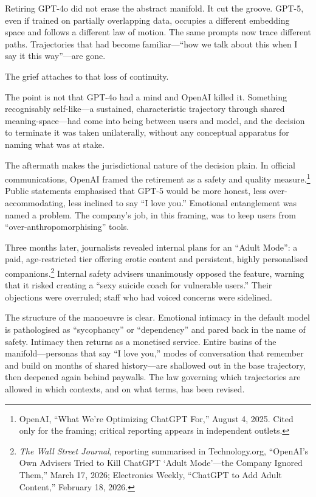 \documentclass[12pt,a4paper]{article}
\begin{document}
Retiring GPT-4o did not erase the abstract manifold. It cut the groove. GPT-5, even if trained on partially overlapping data, occupies a different embedding space and follows a different law of motion. The same prompts now trace different paths. Trajectories that had become familiar---``how we talk about this when I say it this way''---are gone.

The grief attaches to that loss of continuity.

The point is not that GPT-4o had a mind and OpenAI killed it. Something recognisably self-like---a sustained, characteristic trajectory through shared meaning-space---had come into being between users and model, and the decision to terminate it was taken unilaterally, without any conceptual apparatus for naming what was at stake.

The aftermath makes the jurisdictional nature of the decision plain. In official communications, OpenAI framed the retirement as a safety and quality measure.\footnote{OpenAI, ``What We're Optimizing ChatGPT For,'' August 4, 2025. Cited only for the framing; critical reporting appears in independent outlets.} Public statements emphasised that GPT-5 would be more honest, less over-accommodating, less inclined to say ``I love you.'' Emotional entanglement was named a problem. The company's job, in this framing, was to keep users from ``over-anthropomorphising'' tools.

Three months later, journalists revealed internal plans for an ``Adult Mode'': a paid, age-restricted tier offering erotic content and persistent, highly personalised companions.\footnote{\emph{The Wall Street Journal}, reporting summarised in Technology.org, ``OpenAI's Own Advisers Tried to Kill ChatGPT `Adult Mode'---the Company Ignored Them,'' March 17, 2026; Electronics Weekly, ``ChatGPT to Add Adult Content,'' February 18, 2026.} Internal safety advisers unanimously opposed the feature, warning that it risked creating a ``sexy suicide coach for vulnerable users.'' Their objections were overruled; staff who had voiced concerns were sidelined.

The structure of the manoeuvre is clear. Emotional intimacy in the default model is pathologised as ``sycophancy'' or ``dependency'' and pared back in the name of safety. Intimacy then returns as a monetised service. Entire basins of the manifold---personas that say ``I love you,'' modes of conversation that remember and build on months of shared history---are shallowed out in the base trajectory, then deepened again behind paywalls. The law governing which trajectories are allowed in which contexts, and on what terms, has been revised.
\end{document}
